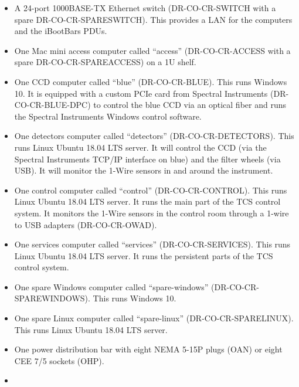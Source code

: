 \documentclass{article}
\begin{document}
\begin{itemize}
\item
A 24-port 1000BASE-TX Ethernet switch (DR-CO-CR-SWITCH with a spare DR-CO-CR-SPARESWITCH). This provides a LAN for the computers and the iBootBars PDUs.
\item
One Mac mini access computer called “access” (DR-CO-CR-ACCESS with a spare DR-CO-CR-SPAREACCESS) on a 1U shelf.
\item
One CCD computer called “blue” (DR-CO-CR-BLUE). This runs Windows 10. It is equipped with a custom PCIe card from Spectral Instruments (DR-CO-CR-BLUE-DPC) to control the blue CCD via an optical fiber and runs the Spectral Instruments Windows control software.
\item
One detectors computer called “detectors” (DR-CO-CR-DETECTORS). This runs Linux Ubuntu 18.04 LTS server. It will control the CCD (via the Spectral Instruments TCP/IP interface on blue) and the filter wheels (via USB). It will monitor the 1-Wire sensors in and around the instrument.
\item
One control computer called “control” (DR-CO-CR-CONTROL). This runs Linux Ubuntu 18.04 LTS server. It runs the main part of the TCS control system. It monitors the 1-Wire sensors in the control room through a 1-wire to USB adapters (DR-CO-CR-OWAD).
\item
One services computer called “services” (DR-CO-CR-SERVICES). This runs Linux Ubuntu 18.04 LTS server. It runs the persistent parts of the TCS control system.
\item
One spare Windows computer called “spare-windows” (DR-CO-CR-SPAREWINDOWS). This runs Windows 10.
\item
One spare Linux computer called “spare-linux” (DR-CO-CR-SPARELINUX). This runs Linux Ubuntu 18.04 LTS server. 
\item
One power distribution bar with eight NEMA 5-15P plugs (OAN) or eight CEE 7/5 sockets (OHP).
\item

\end{itemize}
\end{document}
